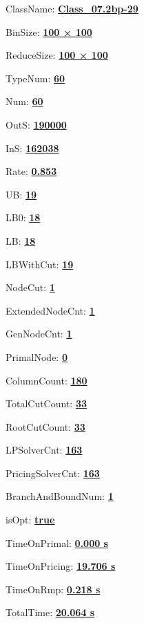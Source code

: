 \documentclass[11pt]{article}
\begin{document}
\pagestyle{empty}


ClassName: \underline{\textbf{Class_07.2bp-29}}
\par
BinSize: \underline{\textbf{100 × 100}}
\par
ReduceSize: \underline{\textbf{100 × 100}}
\par
TypeNum: \underline{\textbf{60}}
\par
Num: \underline{\textbf{60}}
\par
OutS: \underline{\textbf{190000}}
\par
InS: \underline{\textbf{162038}}
\par
Rate: \underline{\textbf{0.853}}
\par
UB: \underline{\textbf{19}}
\par
LB0: \underline{\textbf{18}}
\par
LB: \underline{\textbf{18}}
\par
LBWithCut: \underline{\textbf{19}}
\par
NodeCut: \underline{\textbf{1}}
\par
ExtendedNodeCnt: \underline{\textbf{1}}
\par
GenNodeCnt: \underline{\textbf{1}}
\par
PrimalNode: \underline{\textbf{0}}
\par
ColumnCount: \underline{\textbf{180}}
\par
TotalCutCount: \underline{\textbf{33}}
\par
RootCutCount: \underline{\textbf{33}}
\par
LPSolverCnt: \underline{\textbf{163}}
\par
PricingSolverCnt: \underline{\textbf{163}}
\par
BranchAndBoundNum: \underline{\textbf{1}}
\par
isOpt: \underline{\textbf{true}}
\par
TimeOnPrimal: \underline{\textbf{0.000 s}}
\par
TimeOnPricing: \underline{\textbf{19.706 s}}
\par
TimeOnRmp: \underline{\textbf{0.218 s}}
\par
TotalTime: \underline{\textbf{20.064 s}}
\par
\newpage


\end{document}
